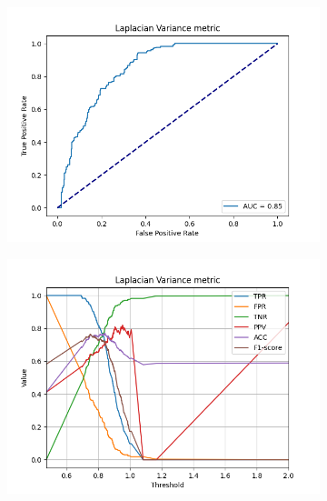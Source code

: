 \begin{figure}[H]
    \begin{subfigure}[t]{0.48\textwidth}
        \includegraphics[width=\textwidth]{Figures/lv/output_roc_lv_jpg.png}
        \caption{}
        \label{fig:LV_roc}
    \end{subfigure}\hspace{1em}
    \begin{subfigure}[t]{0.48\textwidth}
        \includegraphics[width=\textwidth]{Figures/lv/threshold_test_scores_lv_jpg.png}
        \caption{}
        \label{fig:LV_thresh}
    \end{subfigure}\hspace{1em}
    \caption{}
    \label{fig:LV_final}
\end{figure}


